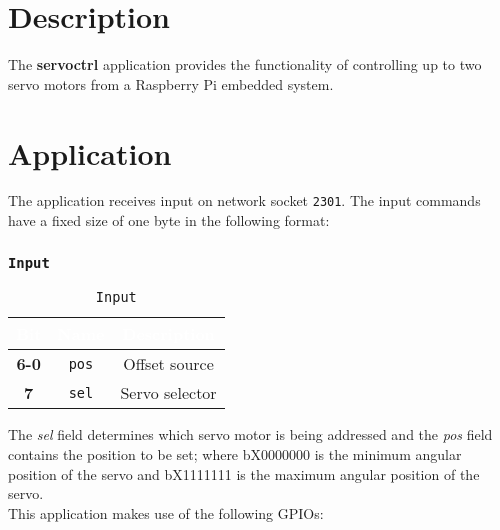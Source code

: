 \section{Description}
The \textbf{servoctrl} application provides the functionality of controlling up
to two servo motors from a Raspberry Pi embedded system.

\section{Application}
The application receives input on network socket \texttt{2301}. The input
commands have a fixed size of one byte in the following format:

   \subsubsection{\texttt{Input}}
   \begin{table}[!htb]
      \begin{center}
         \begin{tabular}{|c|c|c|}
            \rowcolor{black}
            \textcolor{white}{\textbf{Bit}}  &
            \textcolor{white}{\textbf{Name}} &
            \textcolor{white}{\textbf{Description}}\\
            \hline
            \hline
            \textbf{6-0} & \texttt{pos} & Offset source \\
            \hline
            \textbf{7}   & \texttt{sel} & Servo selector \\
            \hline
         \end{tabular}
         \caption{\texttt{Input}}
         \label{table:input}
      \end{center}
   \end{table}

The \textit{sel} field determines which servo motor is being addressed and the
\textit{pos} field contains the position to be set; where bX0000000 is the
minimum angular position of the servo and bX1111111 is the maximum angular
position of the servo.\\

This application makes use of the following GPIOs:

